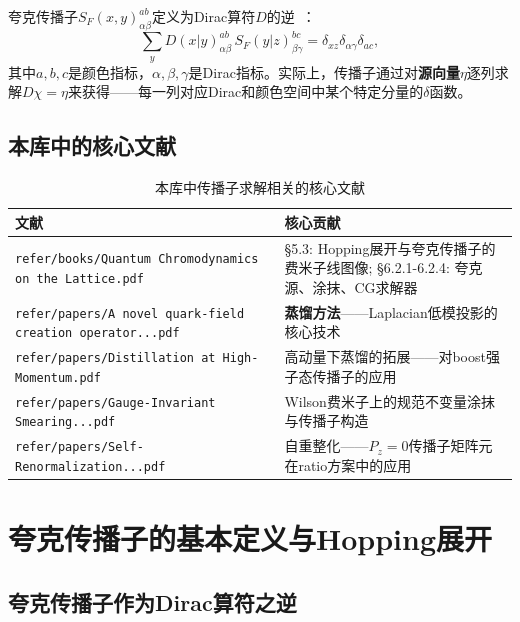 \documentclass[12pt,a4paper]{ctexart}
\theoremstyle{definition}
\begin{document}
夸克传播子$S_F(x, y)^{ab}_{\alpha\beta}$定义为Dirac算符$D$的逆~\cite{GattringerLang2010}：
\begin{equation}
\sum_{y} D(x|y)_{\alpha\beta}^{ab} \, S_F(y|z)_{\beta\gamma}^{bc} = \delta_{xz} \delta_{\alpha\gamma} \delta_{ac},
\label{eq:prop_inverse}
\end{equation}
其中$a,b,c$是颜色指标，$\alpha,\beta,\gamma$是Dirac指标。实际上，传播子通过对\textbf{源向量}$\eta$逐列求解$D \chi = \eta$来获得——每一列对应Dirac和颜色空间中某个特定分量的$\delta$函数。

\subsection{本库中的核心文献}

\begin{table}[H]
\centering
\caption{本库中传播子求解相关的核心文献}
\label{tab:prop_papers}
\small
\begin{tabular}{lp{9cm}}
\toprule
文献 & 核心贡献 \\
\midrule
\texttt{refer/books/Quantum Chromodynamics on the Lattice.pdf}~\cite{GattringerLang2010} &
§5.3: Hopping展开与夸克传播子的费米子线图像; §6.2.1-6.2.4: 夸克源、涂抹、CG求解器 \\
\texttt{refer/papers/A novel quark-field creation operator...pdf}~\cite{Distillation2009} & \textbf{蒸馏方法}——Laplacian低模投影的核心技术 \\
\texttt{refer/papers/Distillation at High-Momentum.pdf} & 高动量下蒸馏的拓展——对boost强子态传播子的应用 \\
\texttt{refer/papers/Gauge-Invariant Smearing...pdf} & Wilson费米子上的规范不变量涂抹与传播子构造 \\
\texttt{refer/papers/Self-Renormalization...pdf}~\cite{Huo2021self} & 自重整化——$P_z=0$传播子矩阵元在ratio方案中的应用 \\
\bottomrule
\end{tabular}
\end{table}

\section{夸克传播子的基本定义与Hopping展开}

\subsection{夸克传播子作为Dirac算符之逆}
\end{document}
